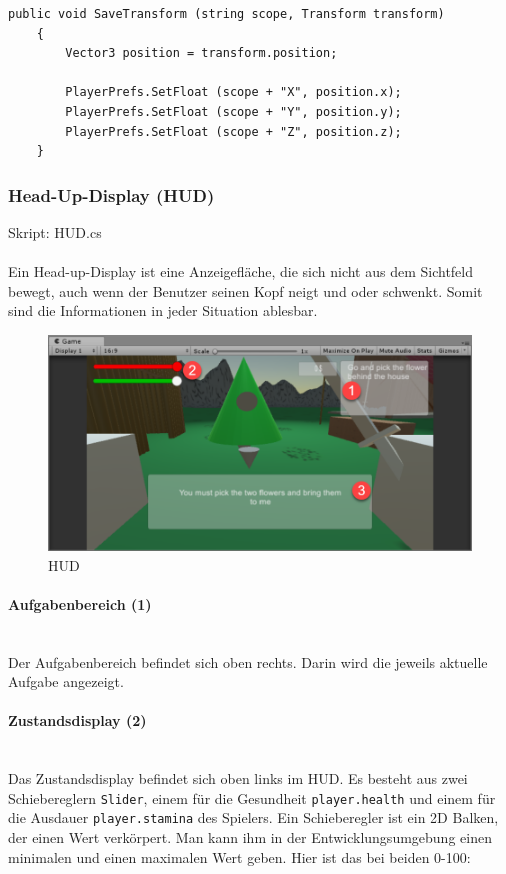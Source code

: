 \begin{lstlisting}[caption={Methode SaveTransform in GameData}]
	public void SaveTransform (string scope, Transform transform)
	{
		Vector3 position = transform.position;

		PlayerPrefs.SetFloat (scope + "X", position.x);
		PlayerPrefs.SetFloat (scope + "Y", position.y);
		PlayerPrefs.SetFloat (scope + "Z", position.z);
	}
\end{lstlisting}

\subsubsection{Head-Up-Display (HUD)}
Skript: HUD.cs\\\\
Ein Head-up-Display ist eine Anzeigefläche, die sich nicht aus dem Sichtfeld bewegt, auch wenn der Benutzer seinen Kopf neigt und oder schwenkt.
Somit sind die Informationen in jeder Situation ablesbar.

\begin{figure}[H]
\includegraphics[scale=0.8]{screenshots/hud.png}
\caption{HUD}
\end{figure}

 
\paragraph{Aufgabenbereich (1)}\mbox{} \\
Der Aufgabenbereich befindet sich oben rechts.
Darin wird die jeweils aktuelle Aufgabe angezeigt.

\paragraph{Zustandsdisplay (2)}\mbox{} \\
Das Zustandsdisplay befindet sich oben links im HUD.
Es besteht aus zwei Schiebereglern \lstinline{Slider}, einem für die Gesundheit \lstinline{player.health} und einem für die Ausdauer \lstinline{player.stamina} des Spielers.
Ein Schieberegler ist ein 2D Balken, der einen Wert verkörpert. Man kann ihm in der Entwicklungsumgebung einen minimalen und einen maximalen Wert geben. Hier ist das bei beiden 0-100:


